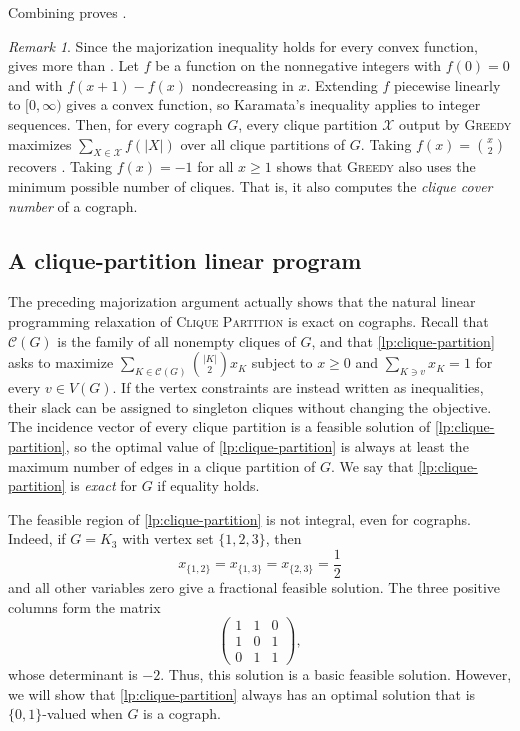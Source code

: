 \documentclass[a4paper,fleqn]{cas-sc}
\theoremstyle{remark}
\newtheorem{rem}[thm]{Remark}
\theoremstyle{plain}
\newcommand{\defn}[1]{\emph{#1}}
\newcommand{\cp}{\textsc{Clique Partition}}
\newcommand{\greedy}{{\textsc{Greedy}}}
\begin{document}
Combining  proves
.

\begin{rem} \label{rem:convex}
Since the majorization inequality holds for every convex function,  gives more than .  Let $f$ be a function on the nonnegative integers with $f(0)=0$ and with $f(x+1)-f(x)$ nondecreasing in $x$. Extending $f$ piecewise linearly to $[0,\infty)$ gives a convex function, so Karamata's inequality applies to integer sequences.  Then, for every cograph $G$, every clique partition $\mathcal{X}$ output by \greedy{} maximizes $\sum_{X\in\mathcal{X}}f(|X|)$ over all clique partitions of $G$.  Taking $f(x)=\binom{x}{2}$ recovers . Taking $f(x)=-1$ for all $x\geq 1$ shows that \greedy{} also uses the minimum possible number of cliques. That is, it also computes the \emph{clique cover number} of a cograph.
\end{rem}

\subsection{A clique-partition linear program}

The preceding majorization argument actually shows that the natural linear
programming relaxation of \cp{} is exact on cographs. Recall that $\mathcal{C}(G)$ is the family of all
nonempty cliques of $G$, and that \eqref{lp:clique-partition} asks to maximize $\sum_{K\in\mathcal{C}(G)}\binom{|K|}{2}x_K$ subject to $x\geq 0$ and $\sum_{K \ni v} x_K=1$ for every $v\in V(G)$.
If the vertex constraints are instead written as inequalities, their
slack can be assigned to singleton cliques without changing the
objective.  The incidence vector of every clique partition is a feasible solution of \eqref{lp:clique-partition}, so the optimal value of \eqref{lp:clique-partition} is always at least the maximum number of edges in a clique partition of $G$.  We say that \eqref{lp:clique-partition} is \defn{exact} for $G$ if equality holds.

The feasible region of \eqref{lp:clique-partition} is not integral,
even for cographs. Indeed, if $G=K_3$ with vertex set $\{1,2,3\}$,
then
\[
x_{\{1,2\}}=x_{\{1,3\}}=x_{\{2,3\}}=\frac12
\]
and all other variables zero give a fractional feasible solution. The
three positive columns form the matrix
\[
\begin{pmatrix}
1&1&0\\
1&0&1\\
0&1&1
\end{pmatrix},
\]
whose determinant is $-2$. Thus, this solution is a basic feasible
solution. However, we will show that \eqref{lp:clique-partition} always has an optimal solution that is $\{0,1\}$-valued when $G$ is a cograph.
\end{document}
